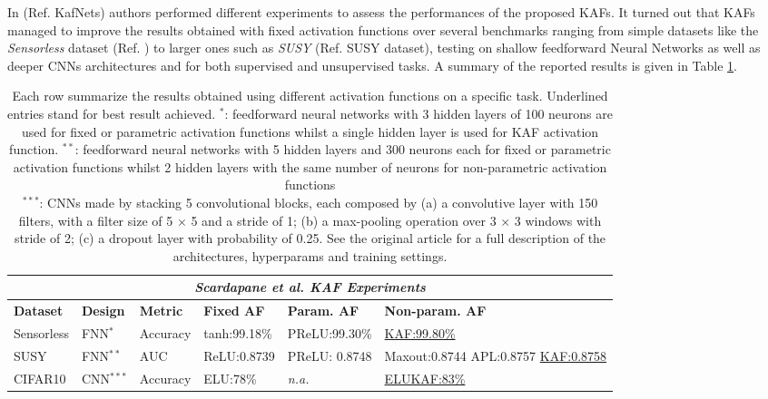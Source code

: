 \documentclass[LaM,binding=0.6cm]{./packages/sapthesis/sapthesis}
\begin{document}
    In (Ref. KafNets) authors performed different experiments to assess the performances of the proposed KAFs.
    It turned out that KAFs managed to improve the results obtained with fixed activation functions over several benchmarks ranging from simple datasets 
    like the \textit{Sensorless} dataset (Ref. ) to larger ones such as \textit{SUSY} (Ref. SUSY dataset), testing on shallow feedforward Neural Networks
    as well as deeper CNNs architectures and for both supervised and unsupervised tasks. A summary of the reported results is given in Table \ref{tab:scardapanekafexp}.  
    
    \begin{table}
        \begin{tabular}{ |p{1.5cm}||p{2cm}|p{1.6cm}|p{2.3cm}|p{2.5cm}|p{2.8cm}|  }
            \hline
            \multicolumn{6}{|c|}{\textit{Scardapane et al. KAF Experiments}} \\
            \hline
            \textbf{Dataset} & \textbf{Design} & \textbf{Metric} & \textbf{Fixed AF}& \textbf{Param. AF} & \textbf{Non-param. AF}\\
            \hline
            \hline
            Sensorless & FNN$^*$  &Accuracy&tanh:99.18\% &PReLU:99.30\% & \underline{ KAF:99.80\% } \\
            \hline
            SUSY&   FNN$^{**} $ &AUC&ReLU:0.8739 & PReLU: 0.8748&Maxout:0.8744 APL:0.8757 \underline{KAF:0.8758} \\
            \hline
            CIFAR10 & CNN$^{***}$ &Accuracy&ELU:78\% & \textit{n.a.} & \underline{ELUKAF:83\%} \\
            \hline
        \end{tabular}
        \caption{Each row summarize the results obtained using different activation functions on a specific task. 
        Underlined entries stand for best result achieved.
        $^*$: feedforward neural networks with 3 hidden layers of 100 neurons are used for fixed or parametric activation functions whilst a single hidden layer is used 
        for KAF activation function.
        $^{**}$: feedforward neural networks with 5 hidden layers and 300 neurons each for fixed or parametric activation functions whilst 2 hidden layers with the same
        number of neurons for non-parametric activation functions \\
        $^{***}$: CNNs made by stacking 5 convolutional blocks, each composed by (a) a convolutive layer with 150 filters, with a
        filter size of 5 × 5 and a stride of 1; (b) a max-pooling operation over 3 × 3
        windows with stride of 2; (c) a dropout layer with probability of 0.25. See the original article for a full description of the architectures, hyperparams and training
        settings.}
        \label{tab:scardapanekafexp}
    \end{table}
       
\end{document}
